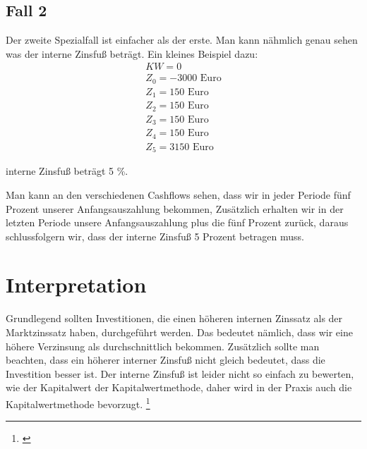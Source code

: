 \subsection{Fall 2}
Der zweite Spezialfall ist einfacher als der erste. Man kann nähmlich genau sehen was der interne Zinsfuß beträgt. Ein kleines Beispiel dazu:
\begin{align*}
    KW = 0                   \\
    Z_0 = -3000 \text{ Euro} \\
    Z_1 = 150 \text{ Euro}   \\
    Z_2 = 150 \text{ Euro}   \\
    Z_3 = 150 \text{ Euro}   \\
    Z_4 = 150 \text{ Euro}   \\
    Z_5 = 3150 \text{ Euro}
\end{align*}
\begin{center}
    interne Zinsfuß beträgt 5 \%.
\end{center}
Man kann an den verschiedenen Cashflows sehen, dass wir in jeder Periode fünf Prozent unserer Anfangsauszahlung bekommen, Zusätzlich erhalten wir in der letzten Periode unsere Anfangsauszahlung plus die fünf Prozent zurück, daraus schlussfolgern wir, dass der interne Zinsfuß 5 Prozent betragen muss.
\section{Interpretation}
Grundlegend sollten Investitionen, die einen höheren internen Zinssatz als der Marktzinssatz haben, durchgeführt werden. Das bedeutet nämlich, dass wir eine höhere Verzinsung als durchschnittlich bekommen. Zusätzlich sollte man beachten, dass ein höherer interner Zinsfuß nicht gleich bedeutet, dass die Investition besser ist. Der interne Zinsfuß ist leider nicht so einfach zu bewerten, wie der Kapitalwert der Kapitalwertmethode, daher wird in der Praxis auch die Kapitalwertmethode bevorzugt.
\footnote{\cite{studyflix-interner-zinsfuss}}